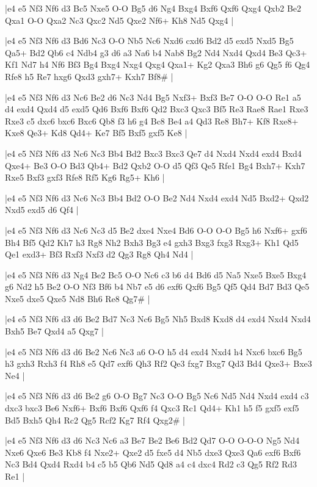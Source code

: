 \whitename{}
\blackname{}
\makegametitle
|e4 e5 Nf3 Nf6 d3 Bc5 Nxe5 O-O Bg5 d6 Ng4 Bxg4 Bxf6 Qxf6 Qxg4 Qxb2 Be2 Qxa1 O-O Qxa2 Nc3 Qxc2 Nd5 Qxe2 Nf6+ Kh8 Nd5 Qxg4  |

\whitename{}
\blackname{}
\makegametitle
|e4 e5 Nf3 Nf6 d3 Bd6 Nc3 O-O Nb5 Nc6 Nxd6 cxd6 Bd2 d5 exd5 Nxd5 Bg5 Qa5+ Bd2 Qb6 c4 Ndb4 g3 d6 a3 Na6 b4 Nab8 Bg2 Nd4 Nxd4 Qxd4 Be3 Qc3+ Kf1 Nd7 h4 Nf6 Bf3 Bg4 Bxg4 Nxg4 Qxg4 Qxa1+ Kg2 Qxa3 Bh6 g6 Qg5 f6 Qg4 Rfe8 h5 Re7 hxg6 Qxd3 gxh7+ Kxh7 Bf8\#  |

\whitename{}
\blackname{}
\makegametitle
|e4 e5 Nf3 Nf6 d3 Nc6 Be2 d6 Nc3 Nd4 Bg5 Nxf3+ Bxf3 Be7 O-O O-O Re1 a5 d4 exd4 Qxd4 d5 exd5 Qd6 Bxf6 Bxf6 Qd2 Bxc3 Qxc3 Bf5 Re3 Rae8 Rae1 Rxe3 Rxe3 c5 dxc6 bxc6 Bxc6 Qb8 f3 h6 g4 Bc8 Be4 a4 Qd3 Re8 Bh7+ Kf8 Rxe8+ Kxe8 Qe3+ Kd8 Qd4+ Ke7 Bf5 Bxf5 gxf5 Ke8  |

\whitename{}
\blackname{}
\makegametitle
|e4 e5 Nf3 Nf6 d3 Nc6 Nc3 Bb4 Bd2 Bxc3 Bxc3 Qe7 d4 Nxd4 Nxd4 exd4 Bxd4 Qxe4+ Be3 O-O Bd3 Qb4+ Bd2 Qxb2 O-O d5 Qf3 Qe5 Rfe1 Bg4 Bxh7+ Kxh7 Rxe5 Bxf3 gxf3 Rfe8 Rf5 Kg6 Rg5+ Kh6  |

\whitename{}
\blackname{}
\makegametitle
|e4 e5 Nf3 Nf6 d3 Nc6 Nc3 Bb4 Bd2 O-O Be2 Nd4 Nxd4 exd4 Nd5 Bxd2+ Qxd2 Nxd5 exd5 d6 Qf4  |

\whitename{}
\blackname{}
\makegametitle
|e4 e5 Nf3 Nf6 d3 Nc6 Nc3 d5 Be2 dxe4 Nxe4 Bd6 O-O O-O Bg5 h6 Nxf6+ gxf6 Bh4 Bf5 Qd2 Kh7 h3 Rg8 Nh2 Bxh3 Bg3 e4 gxh3 Bxg3 fxg3 Rxg3+ Kh1 Qd5 Qe1 exd3+ Bf3 Rxf3 Nxf3 d2 Qg3 Rg8 Qh4 Nd4  |

\whitename{}
\blackname{}
\makegametitle
|e4 e5 Nf3 Nf6 d3 Ng4 Be2 Bc5 O-O Nc6 c3 b6 d4 Bd6 d5 Na5 Nxe5 Bxe5 Bxg4 g6 Nd2 h5 Be2 O-O Nf3 Bf6 b4 Nb7 e5 d6 exf6 Qxf6 Bg5 Qf5 Qd4 Bd7 Bd3 Qe5 Nxe5 dxe5 Qxe5 Nd8 Bh6 Re8 Qg7\#  |

\whitename{}
\blackname{}
\makegametitle
|e4 e5 Nf3 Nf6 d3 d6 Be2 Bd7 Nc3 Nc6 Bg5 Nh5 Bxd8 Kxd8 d4 exd4 Nxd4 Nxd4 Bxh5 Be7 Qxd4 a5 Qxg7  |

\whitename{}
\blackname{}
\makegametitle
|e4 e5 Nf3 Nf6 d3 d6 Be2 Nc6 Nc3 a6 O-O h5 d4 exd4 Nxd4 h4 Nxc6 bxc6 Bg5 h3 gxh3 Rxh3 f4 Rh8 e5 Qd7 exf6 Qh3 Rf2 Qe3 fxg7 Bxg7 Qd3 Bd4 Qxe3+ Bxe3 Ne4  |

\whitename{}
\blackname{}
\makegametitle
|e4 e5 Nf3 Nf6 d3 d6 Be2 g6 O-O Bg7 Nc3 O-O Bg5 Nc6 Nd5 Nd4 Nxd4 exd4 c3 dxc3 bxc3 Be6 Nxf6+ Bxf6 Bxf6 Qxf6 f4 Qxc3 Rc1 Qd4+ Kh1 h5 f5 gxf5 exf5 Bd5 Bxh5 Qh4 Rc2 Qg5 Rcf2 Kg7 Rf4 Qxg2\#  |

\whitename{}
\blackname{}
\makegametitle
|e4 e5 Nf3 Nf6 d3 d6 Nc3 Nc6 a3 Be7 Be2 Be6 Bd2 Qd7 O-O O-O-O Ng5 Nd4 Nxe6 Qxe6 Be3 Kb8 f4 Nxe2+ Qxe2 d5 fxe5 d4 Nb5 dxe3 Qxe3 Qa6 exf6 Bxf6 Nc3 Bd4 Qxd4 Rxd4 b4 c5 b5 Qb6 Nd5 Qd8 a4 c4 dxc4 Rd2 c3 Qg5 Rf2 Rd3 Re1  |

